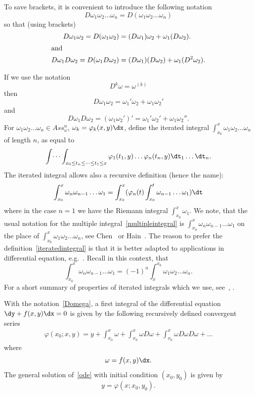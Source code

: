 To save brackets, it is convenient to introduce the following notation
\begin{equation}\label{Domega}
D\omega_1 \omega_2 \dots \omega_n = D(\omega_1 \omega_2 \dots \omega_n)
\end{equation}
so that (using brackets)
\begin{align*}
D \omega_1 \omega_2 =D (\omega_1 \omega_2) &= (D \omega_1) \omega_2 + \omega_1(D \omega_2).
\\
\intertext{and}
D \omega_1 D \omega_2 = D (\omega_1 D \omega_2) &= (D \omega_1)(D \omega_2) + \omega_1 (D^2 \omega_2).
\end{align*}

If we use the notation
\[
D^k\omega = \omega ^{(k)}
\]
then
\[
D \omega_1 \omega_2 = \omega_1' \omega_2+ \omega_1 \omega_2'
\]
and
\[
D \omega_1 D \omega_2 = (\omega_1 \omega_2')' = \omega_1' \omega_2' + \omega_1 \omega_2''.
\]
For $\omega_1\omega_2 \dots \omega_n \in Ass_\omega^n$, $\omega_k= \varphi_k(x,y) \dx$, define the iterated integral $\int_{x_0}^x \omega_1\omega_2 \dots \omega_n$ of length $n$, as equal to
\begin{equation}\label{multipleintegral}
\int \dots \int_{x_0 \leq t_n\leq \dots \leq t_1\leq x} \varphi_1(t_1,y) \dots \varphi_n(t_n,y) \dt_1 \dots \dt_n.
\end{equation}
The iterated integral allows also a recursive definition (hence the name):
\begin{equation}\label{iteratedintegral}
\int_{x_0}^x \omega_n\omega_{n-1} \dots \omega_1 = \int_{x_0}^x (\varphi_n (t) \int_{x_0}^t \omega_{n-1} \dots \omega_1)\dt
\end{equation}
where in the case $n=1$ we have the Riemann integral $\int_{x_0}^x \omega_{1}$. We note, that the usual notation for the multiple integral~\eqref{multipleintegral} is $\int_{x_0}^x \omega_n\omega_{n-1} \dots \omega_1$ on the place of $\int_{x_0}^x \omega_1\omega_2 \dots \omega_n$, see Chen~\cite{chen77} or Hain~\cite{hain87}. The reason to prefer the definition~\eqref{iteratedintegral} is that it is better adapted to applications in differential equation, e.g.~\cite{gavr05}. Recall in this context, that
\[
\int_{x_0}^x \omega_n\omega_{n-1} \dots \omega_1 = (-1)^n \int^{x_0}_x \omega_1\omega_2 \dots \omega_n.
\]
For a short summary of properties of iterated integrals which we use, see~\cite[Appendix]{gavr05}, \cite[Section~2]{gmn09}.


\begin{theo}\label{firstintegral}
With the notation~\eqref{Domega}, a first integral of the differential equation $\dy + f(x,y) \dx = 0$ is given by the following recursively defined convergent series
\begin{align}\label{first2}
\varphi(x_0;x,y) = y + \int_{x_0}^x \omega + \int_{x_0}^x \omega D \omega + \int_{x_0}^x \omega D \omega D \omega +
\dots 
\end{align}
where
\[
\omega = f(x,y) \dx.
\]
The general solution of~\eqref{ode} with initial condition $(x_0,y_0)$ is given by
\[
y= \varphi(x;x_0,y_0).
\]
\end{theo}

